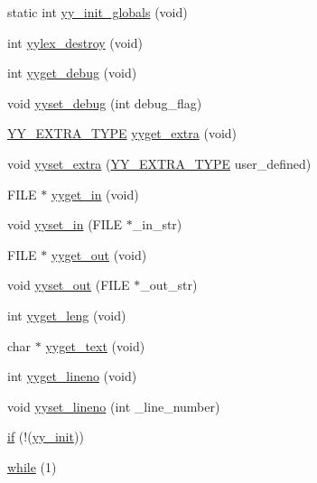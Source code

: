 \begin{DoxyCompactItemize}
\item 
static int \hyperlink{_genesys_09_09-scanner_8cpp_a599b60cd059cf60e89cc49953dc708d0}{yy\-\_\-init\-\_\-globals} (void)
\item 
int \hyperlink{_genesys_09_09-scanner_8cpp_ab596ae57cdabfb4b298edf3dde7cdf04}{yylex\-\_\-destroy} (void)
\item 
int \hyperlink{_genesys_09_09-scanner_8cpp_a4d4e3dd7e6f1d795e01b61794b31ac34}{yyget\-\_\-debug} (void)
\item 
void \hyperlink{_genesys_09_09-scanner_8cpp_ac571eade4cca933e8ccdf6759c527fe7}{yyset\-\_\-debug} (int debug\-\_\-flag)
\item 
\hyperlink{_genesys_09_09-scanner_8cpp_a26938d921de835f6183c02e54cf08828}{Y\-Y\-\_\-\-E\-X\-T\-R\-A\-\_\-\-T\-Y\-P\-E} \hyperlink{_genesys_09_09-scanner_8cpp_ada55bcd8fc1379fb4c103886195dd0e8}{yyget\-\_\-extra} (void)
\item 
void \hyperlink{_genesys_09_09-scanner_8cpp_a2df391b304dadab17608192b116af2a1}{yyset\-\_\-extra} (\hyperlink{_genesys_09_09-scanner_8cpp_a26938d921de835f6183c02e54cf08828}{Y\-Y\-\_\-\-E\-X\-T\-R\-A\-\_\-\-T\-Y\-P\-E} user\-\_\-defined)
\item 
F\-I\-L\-E $\ast$ \hyperlink{_genesys_09_09-scanner_8cpp_a07cc38fe7bf6439f85eace2335cb889f}{yyget\-\_\-in} (void)
\item 
void \hyperlink{_genesys_09_09-scanner_8cpp_a14346b28ae39537ab27caacebfcb31a7}{yyset\-\_\-in} (F\-I\-L\-E $\ast$\-\_\-in\-\_\-str)
\item 
F\-I\-L\-E $\ast$ \hyperlink{_genesys_09_09-scanner_8cpp_a551358cae0f2c14b700b72cb3846d2c4}{yyget\-\_\-out} (void)
\item 
void \hyperlink{_genesys_09_09-scanner_8cpp_ad8174301995e5a61ab330516ec081e35}{yyset\-\_\-out} (F\-I\-L\-E $\ast$\-\_\-out\-\_\-str)
\item 
int \hyperlink{_genesys_09_09-scanner_8cpp_a81867b0419accbe7b3c2d59ffb203da9}{yyget\-\_\-leng} (void)
\item 
char $\ast$ \hyperlink{_genesys_09_09-scanner_8cpp_ad1489f69c327c150a13bcbeeb9799266}{yyget\-\_\-text} (void)
\item 
int \hyperlink{_genesys_09_09-scanner_8cpp_a3ac85cdab63967ff82c7534d35a42fe6}{yyget\-\_\-lineno} (void)
\item 
void \hyperlink{_genesys_09_09-scanner_8cpp_aca0fe76da7a277561738a9a14ab8cb0a}{yyset\-\_\-lineno} (int \-\_\-line\-\_\-number)
\item 
\hyperlink{_genesys_09_09-scanner_8cpp_ad4a65b873df5c05570846b5413b41dfd}{if} (!(\hyperlink{_genesys_09_09-scanner_8cpp_aeae6dabf9dcc4769518ecf054181b1c8}{yy\-\_\-init}))
\item 
\hyperlink{_genesys_09_09-scanner_8cpp_a8fdafe3be7e00ce3d4f0cb50a9a5eb39}{while} (1)
\end{DoxyCompactItemize}
